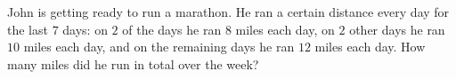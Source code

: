 John is getting ready to run a marathon. He ran a certain distance every day for the last $7$ days: on $2$ of the days he ran $8$ miles each day, on $2$ other days he ran $10$ miles each day, and on the remaining days he ran $12$ miles each day. How many miles did he run in total over the week?
